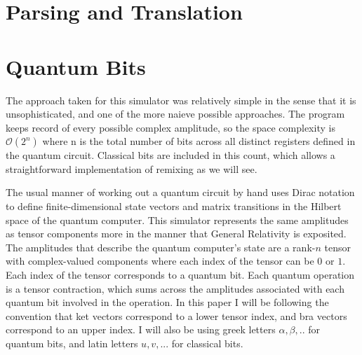 \documentclass[%
 reprint,
 amsmath,amssymb,
 aps,
]{revtex4-2}
\begin{document}
\section{\label{sec:level1} Parsing and Translation}

\section{\label{sec:level1} \label{qubits} Quantum Bits}
The approach taken for this simulator was relatively simple in the sense that it is unsophisticated, and one of the more naieve possible approaches. The program keeps record of every possible complex amplitude, so the space complexity is $\mathcal{O}(2^n)$ where n is the total number of bits across all distinct registers defined in the quantum circuit. Classical bits are included in this count, which allows a straightforward implementation of remixing as we will see.

The usual manner of working out a quantum circuit by hand uses Dirac notation to define finite-dimensional state vectors and matrix transitions in the Hilbert space of the quantum computer. This simulator represents the same amplitudes as tensor components more in the manner that General Relativity is exposited. The amplitudes that describe the quantum computer's state are a rank-$n$ tensor with complex-valued components where each index of the tensor can be $0$ or $1$\cite{kattemolleQuantum}. Each index of the tensor corresponds to a quantum bit. Each quantum operation is a tensor contraction, which sums across the amplitudes associated with each quantum bit involved in the operation. In this paper I will be following the convention that ket vectors correspond to a lower tensor index, and bra vectors correspond to an upper index. I will also be using greek letters $\alpha, \beta, ..$ for quantum bits, and latin letters $u, v,...$ for classical bits.
\end{document}
